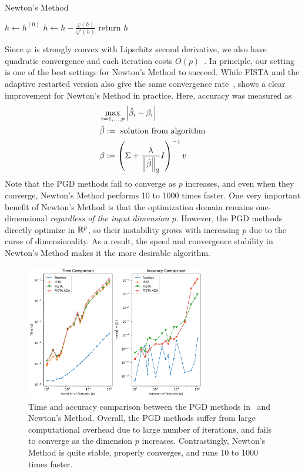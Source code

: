 \begin{algorithm}[t]
    \caption{Newton's Method}\label{alg:newton:newton}
    $h \gets h^{(0)}$\;
     {
        $h \gets h - \frac{\varphi(h)}{\varphi'(h)}$\;
    }
    return $h$\;
\end{algorithm}

Since $\varphi$ is strongly convex with Lipschitz second derivative,
we also have quadratic convergence and each iteration costs $O(p)$~\citep{boyd:2004}.
In principle, our setting is one of the best settings for Newton's Method to succeed.
While FISTA 
and the adaptive restarted version
also give the same convergence rate~\citep{beck:2009,odonoghue:2015},
 shows a clear improvement for Newton's Method in practice.
Here, accuracy was measured as
\begin{align}
    &\max\limits_{i=1,\ldots,p} 
    \left|\hat{\beta}_i - \beta_i\right|
    \label{eq:accuracy}
    \\
    &\hat{\beta} 
    :=
    \text{ solution from algorithm}
    \nonumber
    \\
    &\beta
    :=
    \left(\Sigma + \frac{\lambda}{\left\|\hat{\beta}\right\|_2} I\right)^{-1} v
    \nonumber
\end{align}
Note that the PGD methods fail to converge as $p$ increases,
and even when they converge, Newton's Method performs 10 to 1000 times faster.
One very important benefit of Newton's Method 
is that the optimization domain remains one-dimensional \emph{regardless of the input dimension $p$}.
However, the PGD methods directly optimize in $\mathbb{R}^p$,
so their instability grows with increasing $p$ due to the curse of dimensionality.
As a result, the speed and convergence stability in Newton's Method 
makes it the more desirable algorithm.

\begin{figure}[t]
    \centering
    \includegraphics[width=0.7\textwidth]{figures/pgd_newton_fista_newton.pdf}
    \caption{Time and accuracy comparison between the PGD methods 
    in~ and Newton's Method.
    Overall, the PGD methods suffer from large computational overhead due to large number of iterations,
    and fails to converge as the dimension $p$ increases.
    Contrastingly, Newton's Method is quite stable, properly converges, and runs 10 to 1000 times faster.
    }
    \label{fig:newton:pgd-newton}
\end{figure}

